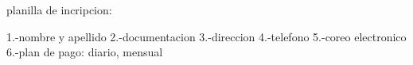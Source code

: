 
planilla de incripcion:

1.-nombre y apellido
2.-documentacion
3.-direccion
4.-telefono
5.-coreo electronico
6.-plan de pago: diario, mensual

